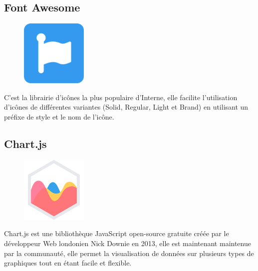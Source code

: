     \subsection{Font Awesome}
            \begin{figure}
                \vspace{-22pt}
              \begin{center}
                 \includegraphics[scale=0.36]{images/logo/fontawesome.png}
                 \label{fig82}
              \end{center}
              \vspace{-20pt}
              \vspace{-10pt}
            \end{figure}
        C’est la librairie d'icônes la plus populaire d'Interne, elle facilite l’utilisation  d’icônes de différentes variantes (Solid, Regular, Light et Brand) en utilisant un préfixe de style et le nom de l'icône\cite{28}.

    \subsection{Chart.js}
            \begin{figure}
                \vspace{-22pt}
              \begin{center}
                 \includegraphics[scale=0.36]{images/logo/chartjs.png}
                 \label{fig83}
              \end{center}
              \vspace{-20pt}
              \vspace{-10pt}
            \end{figure}
        Chart.js est une bibliothèque JavaScript open-source gratuite créée par le développeur Web londonien Nick Downie en 2013, elle est maintenant maintenue par la communauté, elle permet la visualisation de données sur plusieurs types de graphiques tout en étant facile et flexible\cite{29}.
        
